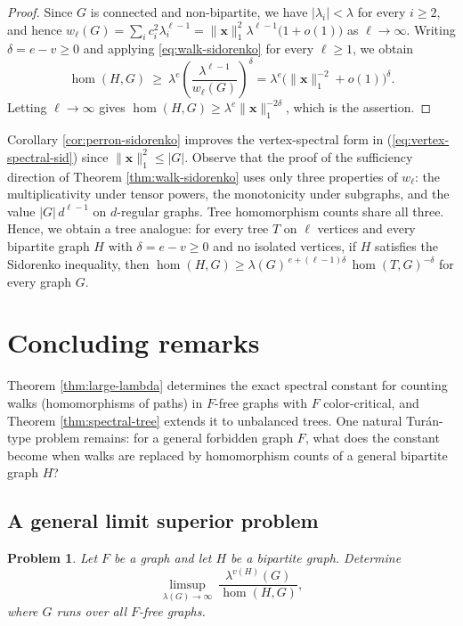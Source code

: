 \documentclass[11pt, a4paper]{article}
\newtheorem{problem}[theorem]{Problem}
\theoremstyle{definition}
\theoremstyle{plain}
\renewcommand{\le}{\leqslant}
\renewcommand{\ge}{\geqslant}
\begin{document}
\begin{proof}
Since $G$ is connected and non-bipartite, we have $|\lambda_i|<\lambda$ for
every $i\ge 2$, and hence
$w_\ell (G)=\sum_i c_i^{2}\lambda_i^{\ell -1}
 =\lVert \bm{x}\rVert_1^{2}\lambda^{\ell -1}\bigl(1+o(1)\bigr)$
as $\ell \to \infty$. Writing $\delta =e-v\ge 0$ and applying
\eqref{eq:walk-sidorenko} for every $\ell \ge 1$, we obtain
\[
  \hom (H,G)\ \ge\ \lambda^{e}
  \left(\frac{\lambda^{\ell -1}}{w_\ell (G)}\right)^{\!\delta}
  =\lambda^{e}\bigl(\lVert \bm{x}\rVert_1^{-2}+o(1)\bigr)^{\delta}.
\]
Letting $\ell \to \infty$ gives
$\hom (H,G)\ge \lambda^{e}\lVert \bm{x}\rVert_1^{-2\delta}$,
which is the assertion.
\end{proof}

Corollary \ref{cor:perron-sidorenko} improves the
vertex-spectral form in (\ref{eq:vertex-spectral-sid}) since $\lVert \bm{x}\rVert_1^{2}\le |G|$. 
Observe that the proof of the sufficiency direction of 
Theorem \ref{thm:walk-sidorenko} uses only three properties of $w_\ell$: 
the multiplicativity under tensor powers, 
the monotonicity under subgraphs,
and the value $|G|\,d^{\ell -1}$ on $d$-regular graphs. 
Tree homomorphism counts share all three. 
Hence, we obtain a tree analogue: 
for every tree $T$ on $\ell$ vertices and every
 bipartite graph $H$ with $\delta =e-v\ge 0$ and no
isolated vertices, if $H$ satisfies the Sidorenko inequality, then 
$  \hom (H,G) \ge \lambda (G)^{\,e+(\ell -1)\delta}\,
  \hom (T,G)^{-\delta}$
 for every graph $G$. 



\section{Concluding remarks}
\label{sec:remarks}


Theorem \ref{thm:large-lambda} determines the exact spectral constant for
counting walks (homomorphisms of paths) in $F$-free graphs with $F$ color-critical, and Theorem \ref{thm:spectral-tree} extends it to unbalanced trees. 
One natural Tur\'{a}n-type problem remains: 
for a general forbidden graph $F$, 
what does the constant become when walks are replaced by homomorphism counts of a general bipartite graph $H$?


\subsection{A general limit superior problem}


\begin{problem}  \label{prob-limsup}
Let $F$ be a graph and let $H$ be a bipartite graph. Determine 
\begin{equation*}
   \limsup_{\lambda (G)\to \infty} \ \frac{\lambda^{v(H)}(G)}{\hom (H,G)}, 
   \end{equation*}
where $G$ runs over all $F$-free graphs. 
\end{problem}
\end{document}
